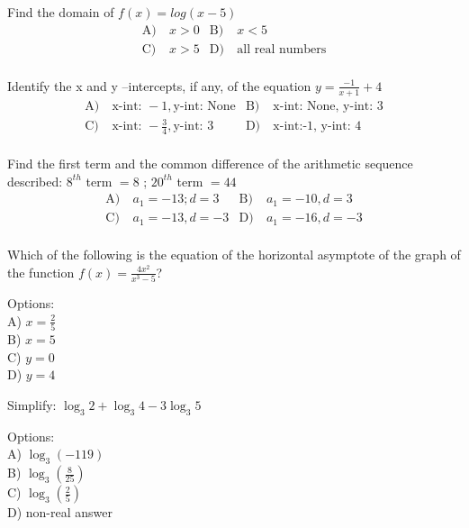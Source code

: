 \begin{problem}\label{PreCal-11}
Find the domain of $f(x)=log(x-5)$
\begin{align*}
\text{A)}\ & x>0 &
\text{B)}\ &  x<5\\
\text{C)}\ & x>5  &
\text{D)}\ & \text{all real numbers}\\
\end{align*}    
\end{problem}


\begin{problem}\label{PreCal-12}
Identify the x and y –intercepts, if any, of the equation $y=\frac{-1}{x+1}+4$
\begin{align*}
\text{A)}\ & \text{x-int: }-1, \text{y-int: None} &
\text{B)}\ &  \text{x-int: None, y-int: }3\\
\text{C)}\ &  \text{x-int: }-\frac{3}{4},  \text{y-int: } 3 &
\text{D)}\ & \text{x-int:-1, y-int: }4\\
\end{align*}    
\end{problem}


\begin{problem}\label{PreCal-13}
Find the first term and the common difference of the arithmetic sequence described: $8^{th}$ term $= 8$  ;  $20^{th}$ term $= 44$
\begin{align*}
\text{A)}\ & a_1=-13; d=3  &
\text{B)}\ & a_1=-10, d=3 \\
\text{C)}\ &  a_1=-13, d=-3 &
\text{D)}\ & a_1=-16, d=-3\\
\end{align*}    
\end{problem}


\begin{problem}\label{AI-Calculus1}
Which of the following is the equation of the horizontal asymptote of the graph of the function \( f(x) = \frac{4x^2}{x^3 - 5} \)?

\noindent Options:\\
A) \( x = \frac{2}{5} \)\\
B) \( x = 5 \)\\
C) \( y = 0 \)\\
D) \( y = 4 \)
\end{problem}


\begin{problem}\label{AI-Algebra10}
Simplify: \( \log_3 2 + \log_3 4 - 3\log_3 5 \)

\noindent Options:\\
A) \( \log_3 (-119) \)\\
B) \( \log_3 \left(\frac{8}{25}\right) \)\\
C) \( \log_3 \left(\frac{2}{5}\right) \)\\
D) non-real answer
\end{problem}


